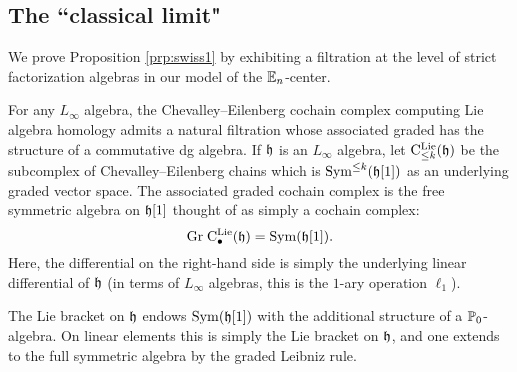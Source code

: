 \documentclass[11pt]{amsart}
\numberwithin{equation}{section}
\def\brian{\textcolor{blue}{BW: }\textcolor{blue}}
\begin{document}


\subsection{The ``classical limit"}

We prove Proposition \ref{prp:swiss1} by exhibiting a filtration at the level of strict factorization algebras in our model of the $\mathbb E_n$-center. 

For any $L_\infty$ algebra, the Chevalley--Eilenberg cochain complex computing Lie algebra homology admits a natural filtration whose associated graded has the structure of a commutative dg algebra.
If $\mathfrak h$ is an $L_\infty$ algebra, let ${\rm C}^{\rm Lie}_{\leq k} (\mathfrak h)$ be the subcomplex of Chevalley--Eilenberg chains which is ${\rm Sym}^{\leq k} (\mathfrak h[1])$ as an underlying graded vector space. 
The associated graded cochain complex is the free symmetric algebra on $\mathfrak h[1]$ thought of as simply a cochain complex:
\[
{\rm Gr} \; {\rm C}^{\rm Lie}_\bullet (\mathfrak h) = {\rm Sym} (\mathfrak h [1])  .
\]
Here, the differential on the right-hand side is simply the underlying linear differential of $\mathfrak h$ (in terms of $L_\infty$ algebras, this is the $1$-ary operation $\ell_1$). 

The Lie bracket on $\mathfrak h$ endows ${\rm Sym} (\mathfrak h [1])$ with the additional structure of a $\mathbb P_0$-algebra. 
On linear elements this is simply the Lie bracket on $\mathfrak h$, and one extends to the full symmetric algebra by the graded Leibniz rule.
\end{document}
